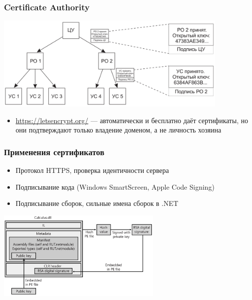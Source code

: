 \documentclass{../../slides-style}
\begin{document}
    \begin{frame}
        \frametitle{Certificate Authority}
        \begin{center}
            \includegraphics[width=0.85\textwidth]{certHierarchy.png}
        \end{center}
        \begin{itemize}
            \item \url{https://letsencrypt.org/} --- автоматически и бесплатно даёт сертификаты, но они подтверждают только владение доменом, а не личность хозяина
        \end{itemize}
    \end{frame}

    \begin{frame}
        \frametitle{Применения сертификатов}
        \begin{itemize}
            \item Протокол HTTPS, проверка идентичности сервера
            \item Подписывание кода (Windows SmartScreen, Apple Code Signing)
            \item Подписывание сборок, сильные имена сборок в .NET
        \end{itemize}
        \begin{center}
            \includegraphics[width=0.6\textwidth]{dotNetCodeSigning.png}
        \end{center}
    \end{frame}
\end{document}
